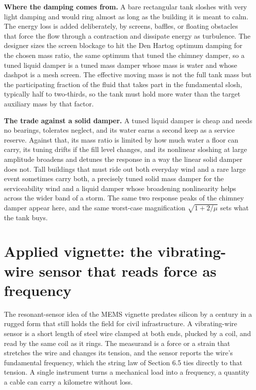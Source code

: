 \textbf{Where the damping comes from.} A bare rectangular tank sloshes
with very light damping and would ring almost as long as the building it
is meant to calm. The energy loss is added deliberately, by screens,
baffles, or floating obstacles that force the flow through a contraction
and dissipate energy as turbulence. The designer sizes the screen
blockage to hit the Den Hartog optimum damping for the chosen mass ratio,
the same optimum that tuned the chimney damper, so a tuned liquid damper
is a tuned mass damper whose mass is water and whose dashpot is a mesh
screen. The effective moving mass is not the full tank mass but the
participating fraction of the fluid that takes part in the fundamental
slosh, typically half to two-thirds, so the tank must hold more water
than the target auxiliary mass by that factor.

\textbf{The trade against a solid damper.} A tuned liquid damper is
cheap and needs no bearings, tolerates neglect, and its water earns a
second keep as a service reserve. Against that, its mass ratio is limited
by how
much water a floor can carry, its tuning drifts if the fill level
changes, and its nonlinear sloshing at large amplitude broadens and
detunes the response in a way the linear solid damper does not. Tall
buildings that must ride out both everyday wind and a rare large event
sometimes carry both, a precisely tuned solid mass damper for the
serviceability wind and a liquid damper whose broadening nonlinearity
helps across the wider band of a storm. The same two response peaks of
the chimney damper appear here, and the same worst-case magnification
$\sqrt{1 + 2/\mu}$ sets what the tank buys.

\section{Applied vignette: the vibrating-wire sensor that reads force as
frequency}

The resonant-sensor idea of the MEMS vignette predates silicon by a
century in a rugged form that still holds the field for civil
infrastructure. A vibrating-wire sensor is a short length of steel wire
clamped at both ends, plucked by a coil, and read by the same coil as it
rings. The measurand is a force or a strain that stretches the wire and
changes its tension, and the sensor reports the wire's fundamental
frequency, which the string law of Section 6.5 ties directly to that
tension. A single instrument turns a mechanical load into a frequency, a
quantity a cable can carry a kilometre without loss.

